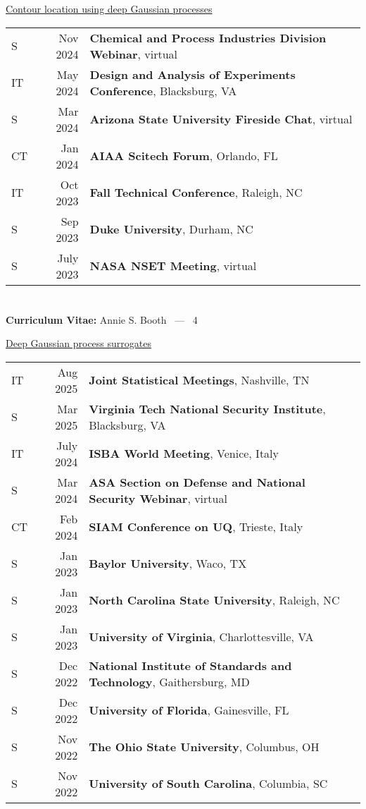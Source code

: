 \documentclass[margin,line,11pt]{res}
\begin{document}
\begin{resume}
\underline{Contour location using deep Gaussian processes}\\
\begin{tabular}{lrl}
S\quad\quad & Nov 2024 & {\bf Chemical and Process Industries Division Webinar}, virtual \\
IT\quad\quad & May 2024 & {\bf Design and Analysis of Experiments Conference}, Blacksburg, VA \\
S\quad\quad & Mar 2024 & {\bf Arizona State University Fireside Chat}, virtual \\
CT\quad\quad & Jan 2024 & {\bf AIAA Scitech Forum}, Orlando, FL \\
IT\quad\quad & Oct 2023 & {\bf Fall Technical Conference}, Raleigh, NC \\
S\quad\quad & Sep 2023 & {\bf Duke University}, Durham, NC \\ 
S\quad\quad & July 2023 & {\bf NASA NSET Meeting}, virtual \\
\end{tabular}

\pagebreak
\section{}
\hfill {\bf Curriculum Vitae:} Annie S. Booth \  --- \  4
\medskip

\underline{Deep Gaussian process surrogates}\\
\begin{tabular}{lrl}
IT\quad\quad & Aug 2025 & {\bf Joint Statistical Meetings}, Nashville, TN \\
S\quad\quad & Mar 2025 & {\bf Virginia Tech National Security Institute}, Blacksburg, VA \\
IT\quad\quad & July 2024 & {\bf ISBA World Meeting}, Venice, Italy \\
S\quad\quad & Mar 2024 & {\bf ASA Section on Defense and National Security Webinar}, virtual \\
CT\quad\quad & Feb 2024 & {\bf SIAM Conference on UQ}, Trieste, Italy \\
S\quad\quad & Jan 2023 & {\bf Baylor University}, Waco, TX \\
S\quad\quad & Jan 2023 & {\bf North Carolina State University}, Raleigh, NC \\
S\quad\quad & Jan 2023 & {\bf University of Virginia}, Charlottesville, VA \\
S\quad\quad & Dec 2022 & {\bf National Institute of Standards and Technology}, Gaithersburg, MD \\
S\quad\quad & Dec 2022 & {\bf University of Florida}, Gainesville, FL \\
S\quad\quad & Nov 2022 & {\bf The Ohio State University}, Columbus, OH \\
S\quad\quad & Nov 2022 & {\bf University of South Carolina}, Columbia, SC \\
\end{tabular}


\end{resume}
\end{document}
